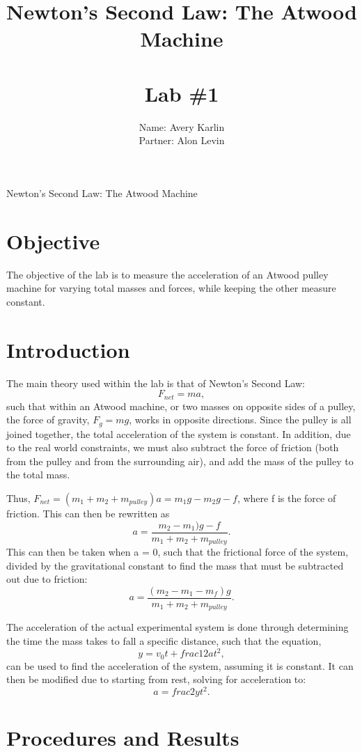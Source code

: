 \documentclass[11pt, titlepage]{article}
\title{Newton's Second Law: The Atwood Machine \\ \ \\ \large Lab \#1}
\author{Name: Avery Karlin \\ Partner: Alon Levin}
\date{}
\begin{document}
\maketitle

\begin{center}
\LARGE Newton's Second Law: The Atwood Machine
\end{center}

\section*{Objective}
The objective of the lab is to measure the acceleration of an Atwood pulley machine for varying total masses and forces, while keeping the other measure constant.
\section*{Introduction}
The main theory used within the lab is that of Newton's Second Law: $$F_{net} = ma,$$ such that within an Atwood machine, or two masses on opposite sides of a pulley, the force of gravity, $F_g = mg$, works in opposite directions. Since the pulley is all joined together, the total acceleration of the system is constant. In addition, due to the real world constraints, we must also subtract the force of friction (both from the pulley and from the surrounding air), and add the mass of the pulley to the total mass.

Thus, $F_{net} = (m_1 + m_2 + m_{pulley})a = m_1g - m_2g - f$, where f is the force of friction. This can then be rewritten as $$a = \frac{m_2 - m_1)g - f}{m_1 + m_2 + m_{pulley}}.$$ This can then be taken when a = 0, such that the frictional force of the system, divided by the gravitational constant to find the mass that must be subtracted out due to friction: $$a = \frac{(m_2 - m_1 - m_f)g}{m_1 + m_2 + m_{pulley}}.$$

The acceleration of the actual experimental system is done through determining the time the mass takes to fall a specific distance, such that the equation, $$y = v_0t + frac{1}{2}at^2,$$ can be used to find the acceleration of the system, assuming it is constant. It can then be modified due to starting from rest, solving for acceleration to: $$a = frac{2y}{t^2}.$$
\section*{Procedures and Results}
\end{document}
